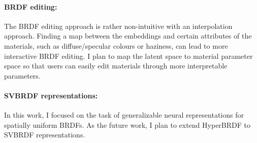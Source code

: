 \paragraph{BRDF editing:} The \gls{BRDF} editing approach is rather non-intuitive with an interpolation approach. Finding a map between the embeddings and certain attributes of the materials, such as diffuse/specular colours or haziness, can lead to more interactive \gls{BRDF} editing. I plan to map the latent space to material parameter space so that users can easily edit materials through more interpretable parameters.

\paragraph{SVBRDF representations:} In this work, I focused on the task of generalizable neural representations for spatially uniform \gls{BRDF}s. As the future work, I plan to extend HyperBRDF to SVBRDF representations.
